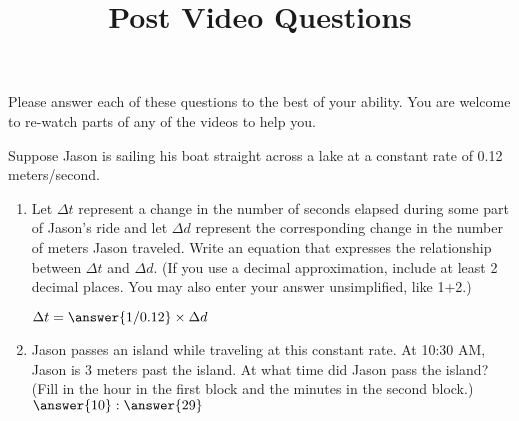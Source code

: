 \documentclass[handout]{ximera}
\title{Post Video Questions}
\begin{document}
\begin{abstract}
\end{abstract}


\maketitle

Please answer each of these questions to the best of your ability. You are welcome to re-watch parts of any of the videos to help you.

\begin{problem}
\item Suppose Jason is sailing his boat straight across a lake at a constant rate of 0.12 meters/second.
\begin{enumerate}
\item Let $\Delta t$ represent a change in the number of seconds elapsed during some part of Jason’s ride and let $\Delta d$ represent the corresponding change in the number of meters Jason traveled. Write an equation that expresses the relationship between $\Delta t$ and $\Delta d$. (If you use a decimal approximation, include at least 2 decimal places. You may also enter your answer unsimplified, like 1+2.)

$\Delta t = \answer{1/0.12} \times \Delta d$

\item Jason passes an island while traveling at this constant rate. At 10:30 AM, Jason is 3 meters past the island. At what time did Jason pass the island? (Fill in the hour in the first block and the minutes in the second block.)
$\answer{10}:\answer{29}$
\end{enumerate}
\end{problem}
\end{document}
